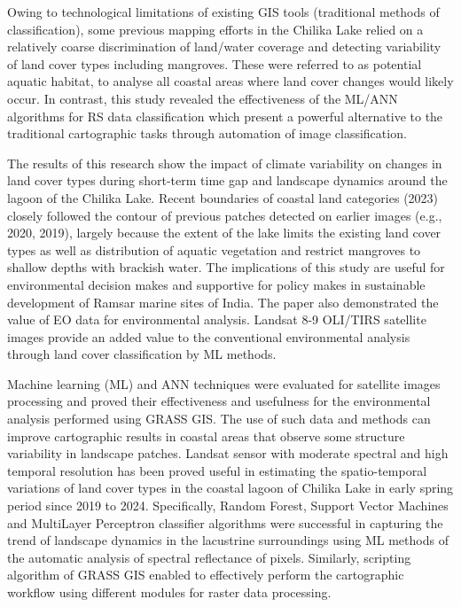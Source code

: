 \documentclass[jmse,article,submit,pdftex,moreauthors]{Definitions/mdpi}
\begin{document}
Owing to technological limitations of existing GIS tools (traditional methods of classification), some previous mapping efforts in the Chilika Lake relied on a relatively coarse discrimination of land/water coverage and detecting variability of land cover types including mangroves. These were referred to as potential aquatic habitat, to analyse all coastal areas where land cover changes would likely occur. In contrast, this study revealed the effectiveness of the ML/ANN algorithms for RS data classification which present a powerful alternative to the traditional cartographic tasks through automation of image classification. 

The results of this research show the impact of climate variability on changes in land cover types during short-term time gap and landscape dynamics around the lagoon of the Chilika Lake. Recent boundaries of coastal land categories (2023) closely followed the contour of previous patches detected on earlier images (e.g., 2020, 2019), largely because the extent of the lake limits the existing land cover types as well as distribution of aquatic vegetation  and restrict mangroves to shallow depths with brackish water. The implications of this study are useful for environmental decision makes and supportive for policy makes in sustainable development of Ramsar marine sites of India. The paper also demonstrated the value of EO data for environmental analysis. Landsat 8-9 OLI/TIRS satellite images provide an added value to the conventional environmental analysis through land cover classification by ML methods. 

Machine learning (ML) and ANN techniques were evaluated for satellite images processing and proved their effectiveness and usefulness for the environmental analysis performed using GRASS GIS. The use of such data and methods can improve cartographic results in coastal areas that observe some structure variability in landscape patches. Landsat sensor with moderate spectral and high temporal resolution has been proved useful in estimating the spatio-temporal variations of land cover types in the coastal lagoon of Chilika Lake in early spring period since 2019 to 2024. Specifically, Random Forest, Support Vector Machines and MultiLayer Perceptron classifier algorithms were successful in capturing the trend of landscape dynamics in the lacustrine surroundings using ML methods of the automatic analysis of spectral reflectance of pixels. Similarly, scripting algorithm of GRASS GIS enabled to effectively perform the cartographic workflow using different modules for raster data processing. 
\end{document}
